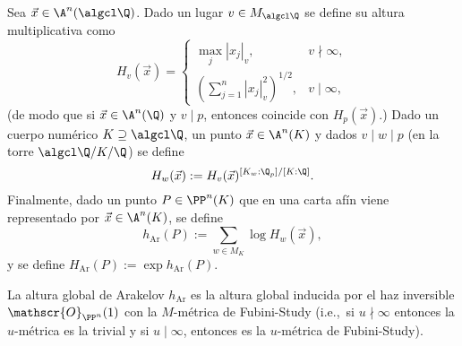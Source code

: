 \documentclass[teoria-numeros.tex]{subfiles}
\begin{document}
\newcommand{\Ar}{\mathrm{Ar}}
\begin{mydef}
	Sea $\vec x \in \A^n(\algcl\Q)$.
	Dado un lugar $v \in M_{\algcl\Q}$ se define su altura multiplicativa como
	\[
		H_v(\vec x) =
		\begin{cases}
			\max_j |x_j|_v, & v \nmid \infty, \\
			\left( \sum_{j=1}^{n} |x_j|_v^2 \right)^{1/2}, & v \mid \infty,
		\end{cases}
	\]
	(de modo que si $\vec x \in \A^n(\Q)$ y $v \mid p$, entonces coincide con $H_p(\vec x)$.)
	Dado un cuerpo numérico $K \supseteq \algcl\Q$, un punto $\vec x \in \A^n(K)$ y dados $v \mid w \mid p$ (en la torre $\algcl\Q/K/\Q$)
	se define
	$$ H_w(\vec x) := H_v(\vec x)^{[K_w : \Q_p] / [K : \Q]}. $$
	Finalmente, dado un punto $P \in \PP^n(K)$ que en una carta afín viene representado por $\vec x \in \A^n(K)$, se define
	$$ h_\Ar(P) := \sum_{w\in M_K} \log H_w(\vec x), $$
	y se define $H_\Ar(P) := \exp h_\Ar(P)$.
\end{mydef}
\begin{obs}
	La altura global de Arakelov $h_\Ar$ es la altura global inducida por el haz inversible $\mathscr{O}_{\PP^n}(1)$
	con la $M$-métrica de Fubini-Study
	(i.e.,\ si $u \nmid \infty$ entonces la $u$-métrica es la trivial y si $u \mid \infty$, entonces es la $u$-métrica de Fubini-Study).
\end{obs}
\end{document}
